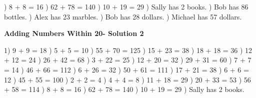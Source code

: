 \documentclass{article}%
\begin{document}
) 8 + 8 = 16%
) 62 + 78 = 140%
) 10 + 19 = 29%
) Sally has 2 books.%
) Bob has 86 bottles.%
) Alex has 23 marbles.%
) Bob has 28 dollars.%
) Michael has 57 dollars.%
\newline%
\newpage%
\large%
\begin{center}%
\textbf{Adding Numbers Within 20- Solution 2}%
\newline%
\end{center} \normalsize%
1) 9 + 9 = 18%
) 5 + 5 = 10%
) 55 + 70 = 125%
) 15 + 23 = 38%
) 18 + 18 = 36%
) 12 + 12 = 24%
) 26 + 42 = 68%
) 3 + 22 = 25%
) 12 + 20 = 32%
) 29 + 31 = 60%
) 7 + 7 = 14%
) 46 + 66 = 112%
) 6 + 26 = 32%
) 50 + 61 = 111%
) 17 + 21 = 38%
) 6 + 6 = 12%
) 45 + 55 = 100%
) 2 + 2 = 4%
) 4 + 4 = 8%
) 11 + 18 = 29%
) 20 + 33 = 53%
) 56 + 58 = 114%
) 8 + 8 = 16%
) 62 + 78 = 140%
) 10 + 19 = 29%
) Sally has 2 books.%
\newline%
\end{document}
